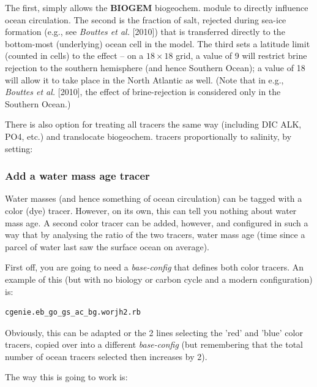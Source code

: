 \documentclass[11pt,fleqn]{book} %
\begin{document}
The first, simply allows the \textbf{BIOGEM} biogeochem. module to directly influence ocean circulation. The second is the fraction of salt, rejected during sea-ice formation (e.g., see \textit{Bouttes et al.} [2010]) that is transferred directly to the bottom-most (underlying) ocean cell in the model. The third sets a latitude limit (counted in cells) to the effect -- on a \(18\times18\) grid, a value of 9 will restrict brine rejection to the southern hemisphere (and hence Southern Ocean); a value of 18 will allow it to take  place in the North Atlantic as well. (Note that in e.g., \textit{Bouttes et al.} [2010], the effect of brine-rejection is considered only in the Southern Ocean.)

There is also option for treating all tracers the same way (including DIC ALK, PO4, etc.) and translocate biogeochem. tracers proportionally to salinity, by setting:

%
\subsubsection{Add a water mass age tracer}
\vspace{1mm}

Water masses (and hence something of ocean circulation) can be tagged with a color (dye) tracer. However, on its own, this can tell you nothing about water mass age. A second color tracer can be added, however, and configured in such a way that by analysing the ratio of the two tracers, water mass age (time since a parcel of water last saw the surface ocean on average).

First off, you are going to need a \textit{base-config} that defines both color tracers. An example of this (but with no biology or carbon cycle and a modern configuration) is:
\vspace{-2pt}\begin{verbatim}
cgenie.eb_go_gs_ac_bg.worjh2.rb
\end{verbatim}\vspace{-2pt}
Obviously, this can be adapted or the 2 lines selecting the 'red' and 'blue' color tracers, copied over into a different \textit{base-config} (but remembering that the total number of ocean tracers selected then increases by 2).

The way this is going to work is:
\end{document}
